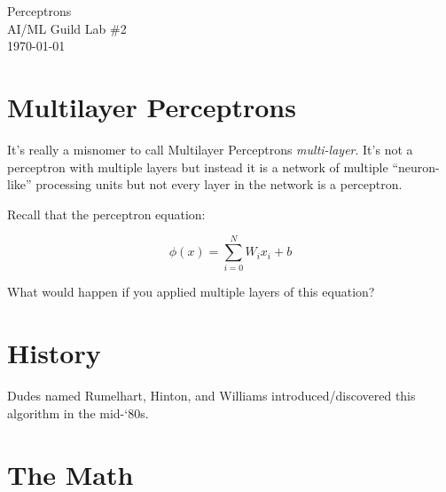 \documentclass[letterpaper,12pt]{article}
\begin{document}
\begin{flushleft}
    Perceptrons\\
    AI/ML Guild Lab \#2\\
    \today \\
\end{flushleft}

\section{Multilayer Perceptrons}

It's really a misnomer to call Multilayer Perceptrons \emph{multi-layer}. It's
not a perceptron with multiple layers but instead it is a network of multiple
``neuron-like'' processing units but not every layer in the network is a
perceptron.

Recall that the perceptron equation:

\[
    \phi(x) = \sum_{i=0}^{N} W_i x_i + b
\]

What would happen if you applied multiple layers of this equation?

\section{History}

Dudes named Rumelhart, Hinton, and Williams introduced/discovered this algorithm
in the mid-‘80s.

\section{The Math}
\end{document}
